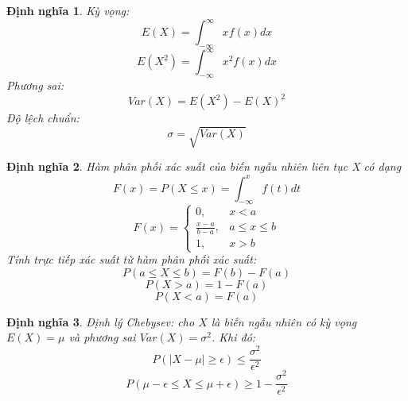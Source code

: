 \documentclass[12pt]{article}
\newtheorem{thm}{Định nghĩa}
\begin{document}
\begin{thm}
    Kỳ vọng:
    \begin{equation}
    E(X) = \int_{-\infty}^{\infty} xf(x)dx
    \end{equation}
    \begin{equation}
    E(X^2) = \int_{-\infty}^{\infty} x^2f(x)dx
    \end{equation}
    Phương sai:
    \begin{equation}
    Var(X) = E(X^2) - E(X)^2
    \end{equation}
    Độ lệch chuẩn:
    \begin{equation}
    \sigma = \sqrt{Var(X)}
    \end{equation}
\end{thm}

\begin{thm}
    Hàm phân phối xác suất của biến ngẫu nhiên liên tục X có dạng
    \begin{equation}
    F(x) = P(X \leq x) = \int_{-\infty}^x f(t)dt
    \end{equation}
    \begin{equation}
    F(x) = \begin{cases}
    0, & x < a \\
    \frac{x-a}{b-a}, & a \leq x \leq b \\
    1, & x > b
    \end{cases}
    \end{equation}
    Tính trực tiếp xác suất từ hàm phân phối xác suất:
    \begin{equation}
    P(a \leq X \leq b) = F(b) - F(a)
    \end{equation}
    \begin{equation}
    P(X > a) = 1 - F(a)
    \end{equation}
    \begin{equation}
    P(X < a) = F(a)
    \end{equation}
\end{thm}

\begin{thm}
    Định lý Chebysev: cho $X$ là biến ngẫu nhiên có kỳ vọng $E(X) = \mu$ và phương sai $Var(X) = \sigma^2$. Khi đó:
    \begin{equation}
    P(|X - \mu| \geq \epsilon) \leq \frac{\sigma^2}{\epsilon^2}
    \end{equation}
    \begin{equation}
        P(\mu - \epsilon \leq X \leq \mu + \epsilon) \geq 1 - \frac{\sigma^2}{\epsilon^2}
    \end{equation}
\end{thm}
\end{document}
